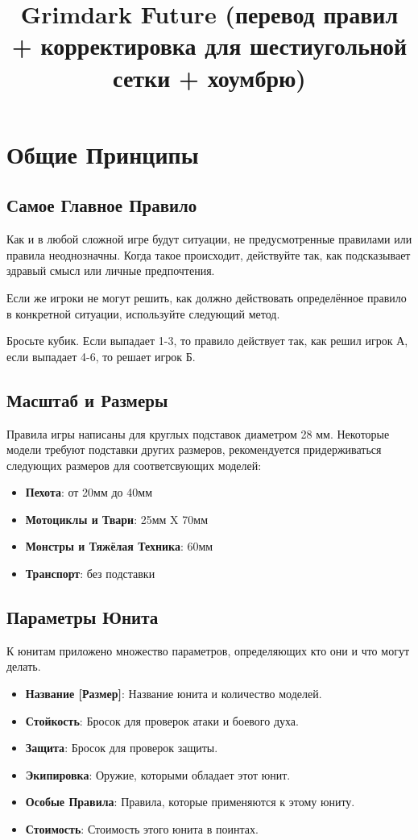 \documentclass[twocolumn]{article}
\title{Grimdark Future (перевод правил + корректировка для шестиугольной сетки + хоумбрю)}
\newcommand{\dicespan}[2]{\mbox{#1-#2}}
\newcommand{\h}[1]{\textbf{#1}}
\begin{document}
\maketitle
\tableofcontents

\newpage

\section{Общие Принципы}
\subsection{Самое Главное Правило}

Как и в любой сложной игре будут ситуации, не предусмотренные правилами или правила неоднозначны. Когда такое происходит, действуйте так, как подсказывает здравый смысл или личные предпочтения.

Если же игроки не могут решить, как должно действовать определённое правило в конкретной ситуации, используйте следующий метод.

Бросьте кубик. Если выпадает \dicespan{1}{3}, то правило действует так, как решил игрок А, если выпадает \dicespan{4}{6}, то решает игрок Б.

\subsection{Масштаб и Размеры}
Правила игры написаны для круглых подставок диаметром 28 мм. Некоторые модели требуют подставки других размеров, рекомендуется придерживаться следующих размеров для соответсвующих моделей:

\begin{itemize}
    \item \h{Пехота}: от 20мм до 40мм
    \item \h{Мотоциклы и Твари}: 25мм X 70мм
    \item \h{Монстры и Тяжёлая Техника}: 60мм
    \item \h{Транспорт}: без подставки
\end{itemize}

\subsection{Параметры Юнита}
К юнитам приложено множество параметров, определяющих кто они и что могут делать.

\begin{itemize}
    \item \h{Название [Размер]}: Название юнита и количество моделей.
    \item \h{Стойкость}: Бросок для проверок атаки и боевого духа.
    \item \h{Защита}: Бросок для проверок защиты.
    \item \h{Экипировка}: Оружие, которыми обладает этот юнит.
    \item \h{Особые Правила}: Правила, которые применяются к этому юниту.
    \item \h{Стоимость}: Стоимость этого юнита в поинтах.
\end{itemize}
\end{document}
